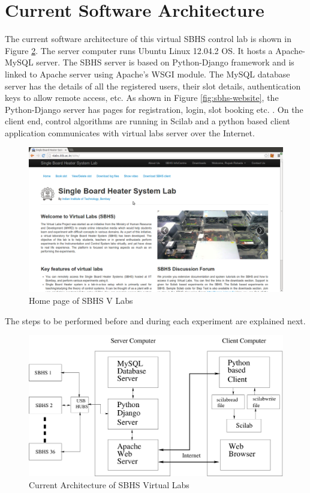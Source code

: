 \section{Current Software Architecture} \label{sec:vlabarchi}
The current software architecture of this virtual SBHS control lab is shown in Figure \ref{fig:detail-arch}. The server computer runs Ubuntu Linux 12.04.2 OS. It hosts a Apache-MySQL server. The SBHS server is based on Python-Django framework and is linked to Apache server using Apache's WSGI module. The MySQL database server has the details of all the registered users, their slot details, authentication keys to allow remote access, etc. As shown in Figure \ref{fig:sbhs-website}, the Python-Django server has pages for registration, login, slot booking etc. \cite{vl010}.  On the client end, control algorithms are running in Scilab and a python based client application communicates with virtual labs server over the Internet.



\begin{figure}
\includegraphics[width=\linewidth]{vlabs/webpage}
\caption{Home page of SBHS V Labs}
\label{vlabs-home}
\end{figure}
The steps to be performed before and during each experiment are explained next.

\begin{figure}
\centering
\includegraphics[width=\linewidth]{vlabs/new-server-arch.pdf}
\caption{Current Architecture of SBHS Virtual Labs}
\label{fig:detail-arch}
\end{figure}

